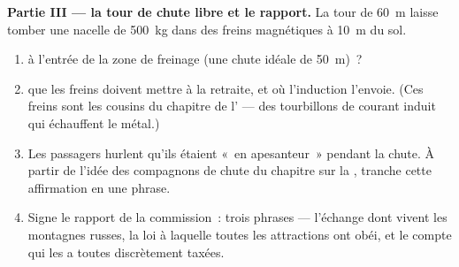 \begin{problem}
\medskip\noindent\textbf{Partie III --- la tour de chute libre et le
rapport.}
La tour de \qty{60}{m} laisse tomber une nacelle de \qty{500}{kg}
dans des freins magnétiques à \qty{10}{m} du sol.
\begin{enumerate}[resume]
  \item {} à l'entrée de la zone de freinage (une chute idéale
        de \qty{50}{m})~?
  \item {} que les freins doivent mettre à la retraite, et où
        l'induction l'envoie. (Ces freins sont les cousins du
        chapitre de l' --- des tourbillons de courant
        induit qui échauffent le métal.)
  \item Les passagers hurlent qu'ils étaient «~en apesanteur~»
        pendant la chute. À partir de l'idée des compagnons de
        chute du chapitre sur la , tranche cette
        affirmation en une phrase.
  \item Signe le rapport de la commission~: trois phrases ---
        l'échange dont vivent les montagnes russes, la loi à
        laquelle toutes les attractions ont obéi, et le compte qui
        les a toutes discrètement taxées.
\end{enumerate}
\end{problem}
